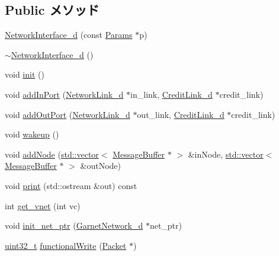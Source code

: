 \subsection*{Public メソッド}
\begin{DoxyCompactItemize}
\item 
\hyperlink{classNetworkInterface__d_a1f5049c73c6c9b05ac58d9ec59df057c}{NetworkInterface\_\-d} (const \hyperlink{classNetworkInterface__d_ab6c40ec3be0502fd09ea61583eecc26a}{Params} $\ast$p)
\item 
\hyperlink{classNetworkInterface__d_aba1b0a4c820667bc51ff0bd8b9e599bd}{$\sim$NetworkInterface\_\-d} ()
\item 
void \hyperlink{classNetworkInterface__d_a02fd73d861ef2e4aabb38c0c9ff82947}{init} ()
\item 
void \hyperlink{classNetworkInterface__d_adbdbe0df8be4baa68257ae0a5badfd2e}{addInPort} (\hyperlink{classNetworkLink__d}{NetworkLink\_\-d} $\ast$in\_\-link, \hyperlink{classCreditLink__d}{CreditLink\_\-d} $\ast$credit\_\-link)
\item 
void \hyperlink{classNetworkInterface__d_a8bb6c70f88a9da2c9adab0d72a2e6e3f}{addOutPort} (\hyperlink{classNetworkLink__d}{NetworkLink\_\-d} $\ast$out\_\-link, \hyperlink{classCreditLink__d}{CreditLink\_\-d} $\ast$credit\_\-link)
\item 
void \hyperlink{classNetworkInterface__d_ae674290a26ecbd622c5160e38e8a4fe9}{wakeup} ()
\item 
void \hyperlink{classNetworkInterface__d_abb78e667f7f184a1989354ba522d32a9}{addNode} (\hyperlink{classstd_1_1vector}{std::vector}$<$ \hyperlink{classMessageBuffer}{MessageBuffer} $\ast$ $>$ \&inNode, \hyperlink{classstd_1_1vector}{std::vector}$<$ \hyperlink{classMessageBuffer}{MessageBuffer} $\ast$ $>$ \&outNode)
\item 
void \hyperlink{classNetworkInterface__d_ac55fe386a101fbae38c716067c9966a0}{print} (std::ostream \&out) const 
\item 
int \hyperlink{classNetworkInterface__d_ae73de77352867d272505f41222809e17}{get\_\-vnet} (int vc)
\item 
void \hyperlink{classNetworkInterface__d_adb63d5adcd3ba8d6d0c6336d7b716243}{init\_\-net\_\-ptr} (\hyperlink{classGarnetNetwork__d}{GarnetNetwork\_\-d} $\ast$net\_\-ptr)
\item 
\hyperlink{Type_8hh_a435d1572bf3f880d55459d9805097f62}{uint32\_\-t} \hyperlink{classNetworkInterface__d_aba9037f662122b5f2e85647d35670e5c}{functionalWrite} (\hyperlink{classPacket}{Packet} $\ast$)
\end{DoxyCompactItemize}
